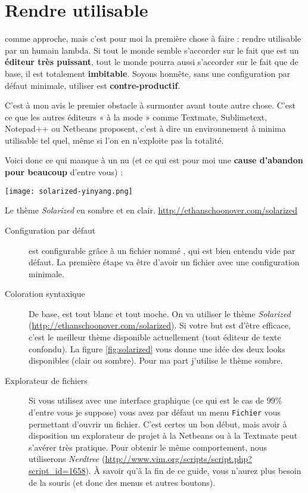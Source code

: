 \chapter{Rendre \vim utilisable}

 comme approche, mais c'est pour moi la première chose à faire : rendre \vim utilisable par un humain lambda. Si tout le monde semble s'accorder sur le fait que \vim est un \textbf{éditeur très puissant}, tout le monde pourra aussi s'accorder sur le fait que de base, il est totalement \textbf{imbitable}. Soyons honnête, sans une configuration par défaut minimale, utiliser \vim est \textbf{contre-productif}. 

C'est à mon avis le premier obstacle à surmonter avant toute autre chose. C'est ce que les autres éditeurs « à la mode » comme Textmate, Sublimetext, Notepad++ ou Netbeans proposent, c'est à dire un environnement à minima utilisable tel quel, même si l'on en n'exploite pas la totalité.

Voici donc ce qui manque à un \vim nu (et ce qui est pour moi une \textbf{cause d'abandon pour beaucoup} d'entre vous) :

\begin{marginfigure}%
  \texttt{[image: solarized-yinyang.png]}
  \caption{Le thème \emph{Solarized} en sombre et en clair. \url{http://ethanschoonover.com/solarized}}
  \label{fig:solarized}
\end{marginfigure}

\begin{description}
    \item[Configuration par défaut] \vim est configurable grâce à un fichier nommé \vimrc, qui est bien entendu vide par défaut. La première étape va être d'avoir un fichier \vimrc avec une configuration minimale.
    \item[Coloration syntaxique] De base, \vim est tout blanc et tout moche. On va utiliser le thème \emph{Solarized} (\url{http://ethanschoonover.com/solarized}). Si votre but est d'être efficace, c'est le meilleur thème disponible actuellement (tout éditeur de texte confondu). La figure \ref{fig:solarized} vous donne une idée des deux looks disponibles (clair ou sombre). Pour ma part j'utilise le thème sombre.
    \item[Explorateur de fichiers] Si vous utilisez \vim avec une interface graphique (ce qui est le cas de 99\% d'entre vous je suppose) vous avez par défaut un menu \Verb|Fichier| vous permettant d'ouvrir un fichier. C'est certes un bon début, mais avoir à disposition un explorateur de projet à la Netbeans ou à la Textmate peut s'avérer très pratique. Pour obtenir le même comportement, nous utiliserons \emph{Nerdtree} (\url{http://www.vim.org/scripts/script.php?script_id=1658}). À savoir qu'à la fin de ce guide, vous n'aurez plus besoin de la souris (et donc des menus et autres boutons).
\end{description}

